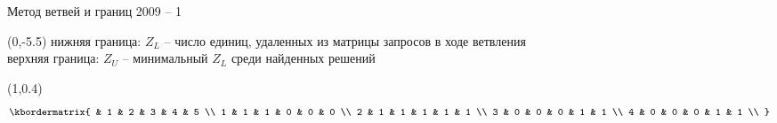 \documentclass[10pt, dvipsnames]{beamer}
\begin{document}

\begin{frame}{Метод ветвей и границ 2009 -- 1}	
	\begin{textblock}{13}(0,-5.5)
нижняя граница: $Z_L$ -- число единиц, удаленных из матрицы запросов в ходе ветвления\\[0.1cm]
верхняя граница: $Z_U$ -- минимальный $Z_L$ среди найденных решений\\[0.2cm]
	\end{textblock}
	
	\begin{textblock}{1}(1,0.4) 
\[
\small
  \kbordermatrix{
      & 1 & 2 & 3 & 4 & 5 \\
    1 & 1 & 1 & 0 & 0 & 0 \\
    2 & 1 & 1 & 1 & 1 & 1 \\
    3 & 0 & 0 & 0 & 1 & 1 \\
    4 & 0 & 0 & 0 & 1 & 1 \\
  }
\]
	\end{textblock}


\end{frame}
\end{document}
